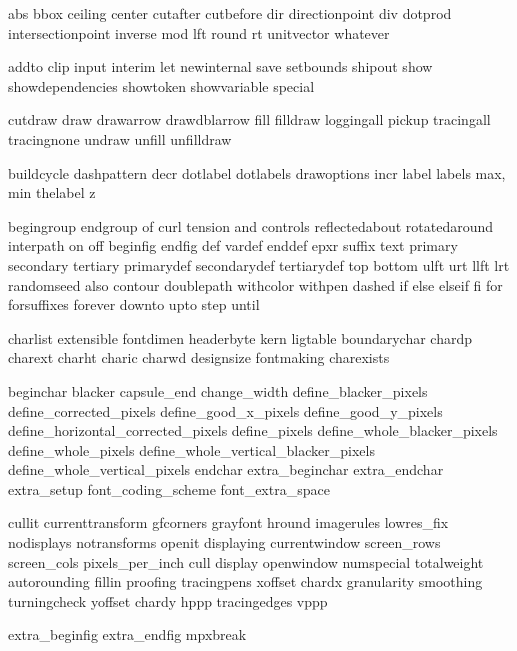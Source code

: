 \useprettyidentifiers \MPvariables \MPsetspecials
  abs bbox ceiling center cutafter cutbefore dir 
  directionpoint div dotprod intersectionpoint inverse mod lft
  round rt unitvector whatever 


\useprettyidentifiers \MPidentifiers \MPsetspecials
  addto clip input interim let newinternal save setbounds 
  shipout show showdependencies showtoken showvariable 
  special 

\useprettyidentifiers \MPvariables \MPsetspecials
  cutdraw draw drawarrow drawdblarrow fill filldraw 
  loggingall pickup tracingall tracingnone undraw unfill 
  unfilldraw 


\useprettyidentifiers \MPvariables \MPsetspecials
  buildcycle dashpattern decr dotlabel dotlabels drawoptions
  incr label labels max, min thelabel z


\useprettyidentifiers \MPidentifiers \MPsetspecials
  begingroup endgroup of curl tension and controls 
  reflectedabout rotatedaround interpath on off beginfig 
  endfig def vardef enddef epxr suffix text primary secondary 
  tertiary primarydef secondarydef tertiarydef top bottom 
  ulft urt llft lrt randomseed also contour doublepath 
  withcolor withpen dashed if else elseif fi for forsuffixes
  forever downto upto step until 


\useprettyidentifiers \MPidentifiers \MPsetspecials
  charlist extensible fontdimen headerbyte kern ligtable 
  boundarychar chardp charext charht charic charwd designsize 
  fontmaking charexists 

\useprettyidentifiers \MPvariables \MPsetspecials
  beginchar blacker capsule_end change_width 
  define_blacker_pixels define_corrected_pixels 
  define_good_x_pixels define_good_y_pixels 
  define_horizontal_corrected_pixels define_pixels 
  define_whole_blacker_pixels define_whole_pixels 
  define_whole_vertical_blacker_pixels 
  define_whole_vertical_pixels endchar extra_beginchar 
  extra_endchar extra_setup font_coding_scheme 
  font_extra_space 


\useprettyidentifiers \MPidentifiers \MPsetspecials
  cullit currenttransform gfcorners grayfont hround 
  imagerules lowres_fix nodisplays notransforms openit 
  displaying currentwindow screen_rows screen_cols 
  pixels_per_inch cull display openwindow numspecial 
  totalweight autorounding fillin proofing tracingpens 
  xoffset chardx granularity smoothing turningcheck yoffset 
  chardy hppp tracingedges vppp


\useprettyidentifiers \MPidentifiers \MPsetspecials
  extra_beginfig extra_endfig mpxbreak 

\protect 

\endinput 
